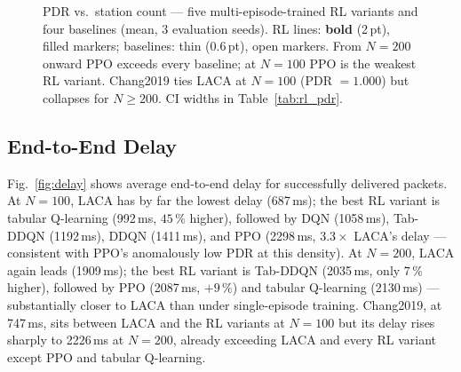 \documentclass[conference]{IEEEtran}
\begin{document}
\begin{figure}[t]
\caption{PDR vs.\ station count — five multi-episode-trained RL variants
  and four baselines (mean, 3 evaluation seeds).  RL lines: \textbf{bold}
  (2\,pt), filled markers; baselines: thin (0.6\,pt), open markers.
  From $N=200$ onward PPO exceeds every baseline; at $N=100$ PPO is the
  weakest RL variant.  Chang2019 ties LACA at $N=100$ (PDR $=1.000$) but
  collapses for $N\geq200$.  CI widths in Table~\ref{tab:rl_pdr}.}
\label{fig:pdr}
\end{figure}

\subsection{End-to-End Delay}

Fig.~\ref{fig:delay} shows average end-to-end delay for successfully
delivered packets.
At $N = 100$, LACA has by far the lowest delay (687\,ms); the best RL
variant is tabular Q-learning (992\,ms, $45\,\%$ higher), followed by DQN
(1058\,ms), Tab-DDQN (1192\,ms), DDQN (1411\,ms), and PPO (2298\,ms,
$3.3\times$ LACA's delay — consistent with PPO's anomalously low PDR at this
density).
At $N = 200$, LACA again leads (1909\,ms); the best RL variant is Tab-DDQN
(2035\,ms, only $7\,\%$ higher), followed by PPO (2087\,ms, $+9\,\%$) and
tabular Q-learning (2130\,ms) — substantially closer to LACA than under
single-episode training.
Chang2019, at 747\,ms, sits between LACA and the RL variants at $N=100$ but
its delay rises sharply to 2226\,ms at $N=200$, already exceeding LACA and
every RL variant except PPO and tabular Q-learning.
\end{document}
